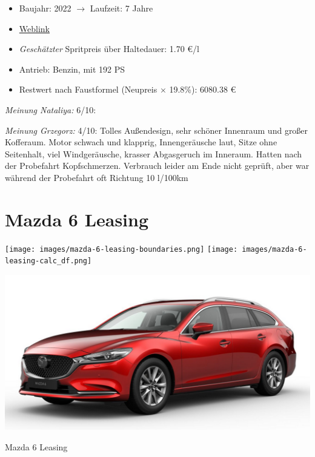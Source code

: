 \documentclass[landscape, DIV=99, 14pt]{scrartcl}
\begin{document}
\begin{itemize}
    \item Baujahr: 2022 $\rightarrow$ Laufzeit: 7 Jahre
    \item \href{https://konfigurator.meinauto.de/mazda/neuwagen/48-6/angebote/6-kombi/konfigurator/\#!/extras/exclusive-line/8846370/10,11/private/65352-5416-204698/984/61c9aa657e74c/cash-purchase/32545--287374/48,0,10000,0,0,0,0,0,}{Weblink}
    \item \emph{Gesch\"atzter} Spritpreis \"uber Haltedauer: 1.70 \euro{}/l
    \item Antrieb: Benzin, mit 192 PS
    \item Restwert nach Faustformel (Neupreis $\times$ 19.8\%): 6080.38 \euro{}
\end{itemize}

\begin{small}
\emph{Meinung Nataliya:} 6/10: 
        
\emph{Meinung Grzegorz:} 4/10: Tolles Au\ss{}endesign, sehr sch\"oner Innenraum und gro\ss{}er Kofferaum. Motor schwach und klapprig, Innenger\"ausche laut, Sitze ohne Seitenhalt, viel Windger\"ausche, krasser Abgasgeruch im Inneraum. Hatten nach der Probefahrt Kopfschmerzen. Verbrauch leider am Ende nicht gepr\"uft, aber war w\"ahrend der Probefahrt oft Richtung 10 l/100km
\end{small}

\pagebreak


\twocolumn

\section*{Mazda 6 Leasing}
\begin{center}
\texttt{[image: images/mazda-6-leasing-boundaries.png]}
\null
\vspace{0.5cm}
\texttt{[image: images/mazda-6-leasing-calc\_df.png]}
\end{center}

\pagebreak
\begin{center}
\includegraphics[width=0.9\columnwidth]{cars/mazda-6-leasing.png}

Mazda 6 Leasing
\end{center}
\end{document}
